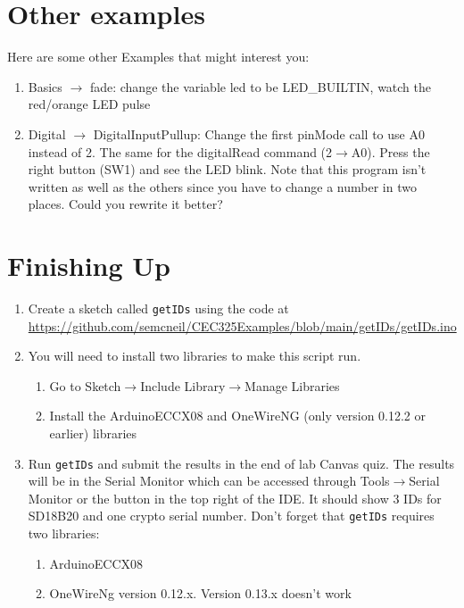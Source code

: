 \section{Other examples}
	Here are some other Examples that might interest you:
	\begin{enumerate}
		\item Basics $\rightarrow$ fade: change the variable led to be LED\_BUILTIN, watch the red/orange LED pulse
		\item Digital $\rightarrow$ DigitalInputPullup: Change the first pinMode call to use A0 instead of 2. The same for 
				the digitalRead command (2$\rightarrow$A0). Press the right button (SW1) and see the LED blink. 
				 Note that this program isn't written as well as the others since you have to change a number in two
				places. Could you rewrite it better?
	\end{enumerate}

\section{Finishing Up}
  \begin{enumerate}
    \item Create a sketch called \lstinline$getIDs$ using the code at \\ 
        \href{https://github.com/semcneil/CEC325Examples/blob/main/getIDs/getIDs.ino}{https://github.com/semcneil/CEC325Examples/blob/main/getIDs/getIDs.ino}
    \item You will need to install two libraries to make this script run.
    \begin{enumerate}
        \item Go to Sketch$\rightarrow$Include Library$\rightarrow$Manage Libraries 
        \item Install the ArduinoECCX08 and OneWireNG (only version 0.12.2 or earlier) libraries
    \end{enumerate}
    \item Run \lstinline$getIDs$ and submit the results in the end of lab Canvas quiz. The results will be 
                in the Serial Monitor which can be accessed through Tools$\rightarrow$Serial Monitor or the 
                button in the top right of the IDE. It should show 3 IDs for SD18B20 and one crypto serial 
                number. Don't forget that \lstinline$getIDs$ requires two libraries:
        \begin{enumerate}
            \item ArduinoECCX08
            \item OneWireNg version 0.12.x. Version 0.13.x doesn't work
        \end{enumerate}
\end{enumerate}

